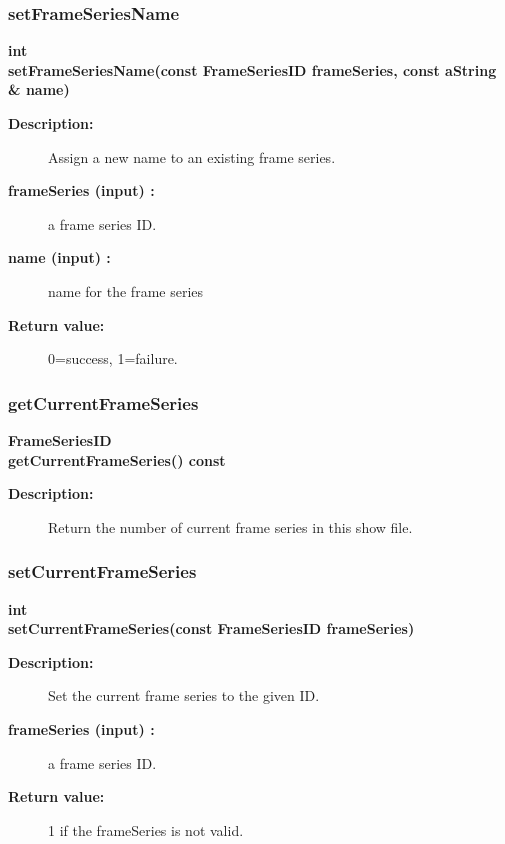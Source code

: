 \subsubsection{setFrameSeriesName}
 
\begin{flushleft} \textbf{%
int  \\ 
\settowidth{\OgshowIncludeArgIndent}{setFrameSeriesName(}%
setFrameSeriesName(const FrameSeriesID frameSeries, const aString \& name)
}\end{flushleft}
\begin{description}
\item[{\bf Description:}] 
     Assign a new name to an existing frame series.
 
\item[{\bf frameSeries (input) :}]  a frame series ID.
\item[{\bf name (input) :}]  name for the frame series
\item[{\bf Return value:}]  0=success, 1=failure.
 
\end{description}
\subsubsection{getCurrentFrameSeries}
 
\begin{flushleft} \textbf{%
FrameSeriesID  \\ 
\settowidth{\OgshowIncludeArgIndent}{getCurrentFrameSeries(}%
getCurrentFrameSeries() const
}\end{flushleft}
\begin{description}
\item[{\bf Description:}] 
   Return the number of current frame series in this show file.
\end{description}
\subsubsection{setCurrentFrameSeries}
 
\begin{flushleft} \textbf{%
int  \\ 
\settowidth{\OgshowIncludeArgIndent}{setCurrentFrameSeries(}%
setCurrentFrameSeries(const FrameSeriesID frameSeries)
}\end{flushleft}
\begin{description}
\item[{\bf Description:}] 
   Set the current frame series to the given ID.
\item[{\bf frameSeries (input) :}]  a frame series ID.
\item[{\bf Return value:}]  1 if the frameSeries is not valid.
\end{description}
